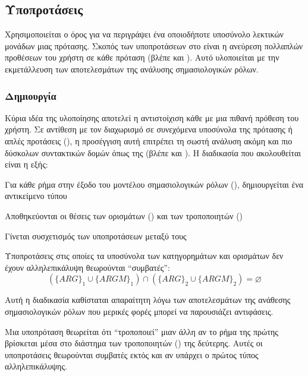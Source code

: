 \subsection{Υποπροτάσεις}\label{subsec:4-subsentences}
Χρησιμοποιείται ο όρος  για να περιγράψει ένα οποιοδήποτε υποσύνολο λεκτικών μονάδων μιας πρότασης.
Σκοπός των υποπροτάσεων στο \projectname{} είναι η ανεύρεση πολλαπλών προθέσεων του χρήστη σε κάθε πρόταση (βλέπε και ).
Αυτό υλοποιείται με την εκμετάλλευση των αποτελεσμάτων της ανάλυσης σημασιολογικών ρόλων.

\subsubsection{Δημιουργία}\label{subsec:4-subsentence-create}
Κύρια ιδέα της υλοποίησης αποτελεί η αντιστοίχιση κάθε  με μια πιθανή πρόθεση του χρήστη.
Σε αντίθεση με τον διαχωρισμό σε συνεχόμενα υποσύνολα της πρότασης ή απλές προτάσεις (),
η προσέγγιση αυτή επιτρέπει τη σωστή ανάλυση ακόμη και πιο δύσκολων συντακτικών δομών όπως της  (βλέπε και ).
Η διαδικασία που ακολουθείται είναι η εξής:
\begin{compactenum}
    \item Για κάθε ρήμα στην έξοδο του μοντέλου σημασιολογικών ρόλων (), δημιουργείται ένα αντικείμενο τύπου 
    \item Αποθηκεύονται οι θέσεις των ορισμάτων (\ARGs{}) και των τροποποιητών (\ARGM{})
    \item Γίνεται συσχετισμός των υποπροτάσεων μεταξύ τους
          \begin{compactenum}
              \item Υποπροτάσεις στις οποίες τα υποσύνολα των κατηγορημάτων και ορισμάτων δεν έχουν αλληλεπικάλυψη θεωρούνται \enquote{συμβατές}:
                    \begin{equation}
                        (\{ARG\}_1 \cup \{ARGM\}_1 ) \cap (\{ARG\}_2 \cup \{ARGM\}_2) = \varnothing
                    \end{equation}

                    Αυτή η διαδικασία καθίσταται απαραίτητη λόγω των αποτελεσμάτων της ανάθεσης σημασιολογικών ρόλων που μερικές φορές μπορεί να παρουσιάζει αντιφάσεις.
              \item Μια υποπρόταση θεωρείται ότι \enquote{τροποποιεί} μιαν άλλη αν το ρήμα της πρώτης βρίσκεται μέσα στο διάστημα των τροποποιητών (\ARGM{}) της δεύτερης.
                    Αυτές οι υποπροτάσεις θεωρούνται συμβατές εκτός και αν υπάρχει ο πρώτος τύπος αλληλεπικάλυψης.
          \end{compactenum}
\end{compactenum}

